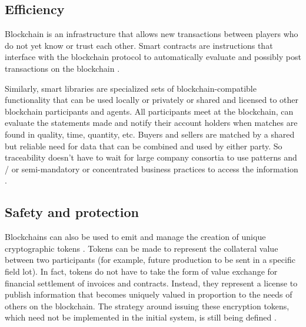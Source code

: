\subsection{Efficiency}\label{sec:efficiency}
Blockchain is an infrastructure that allows new transactions between players who do not yet know or trust each other. Smart contracts are instructions that interface with the blockchain protocol to automatically evaluate and possibly post transactions on the blockchain \cite{raskin2017law}. 

Similarly, smart libraries are specialized sets of blockchain-compatible functionality that can be used locally or privately or shared and licensed to other blockchain participants and agents. All participants meet at the blockchain, can evaluate the statements made and notify their account holders when matches are found in quality, time, quantity, etc. Buyers and sellers are matched by a shared but reliable need for data that can be combined and used by either party. So traceability doesn't have to wait for large company consortia to use patterns and / or semi-mandatory or concentrated business practices to access the information \cite{galvez2018future}.

\subsection{Safety and protection}\label{sec:Safety}
Blockchains can also be used to emit and manage the creation of unique cryptographic tokens \cite{nystrom1999pkcs}. Tokens can be made to represent the collateral value between two participants (for example, future production to be sent in a specific field lot). In fact, tokens do not have to take the form of value exchange for financial settlement of invoices and contracts. Instead, they represent a license to publish information that becomes uniquely valued in proportion to the needs of others on the blockchain. The strategy around issuing these encryption tokens, which need not be implemented in the initial system, is still being defined \cite{galvez2018future}.